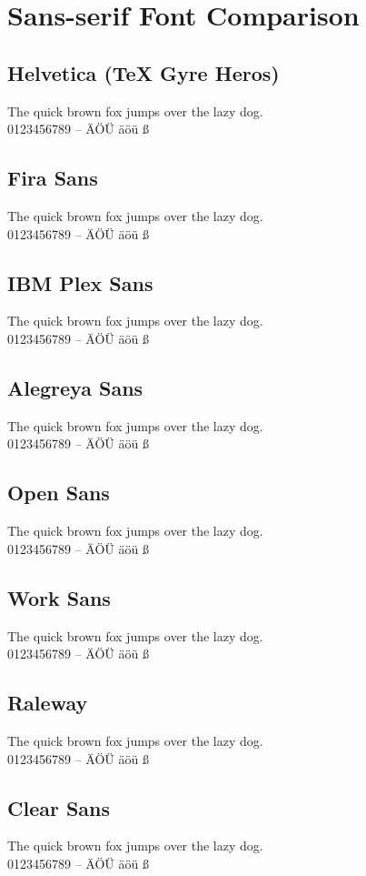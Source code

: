 \documentclass{article}
\newcommand{\sample}{%
The quick brown fox jumps over the lazy dog.\\
0123456789 -- ÄÖÜ äöü ß
}
\begin{document}
\section*{Sans-serif Font Comparison}

\subsection*{Helvetica (TeX Gyre Heros)}
{\sample}

\subsection*{Fira Sans}
{\sample}

\subsection*{IBM Plex Sans}
{\sample}

\subsection*{Alegreya Sans}
{\sample}

\subsection*{Open Sans}
{\sample}

\subsection*{Work Sans}
{\sample}

\subsection*{Raleway}
{\sample}

\subsection*{Clear Sans}
{\sample}
\end{document}

